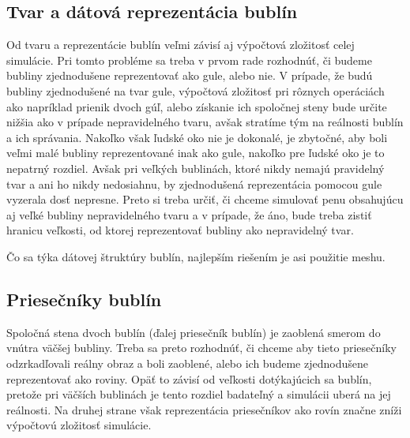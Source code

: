 \subsection{Tvar a dátová reprezentácia bublín}

Od tvaru a reprezentácie bublín veľmi závisí aj výpočtová zložitosť celej simulácie. Pri tomto probléme sa treba v prvom rade rozhodnúť, či budeme bubliny zjednodušene reprezentovať ako gule, alebo nie. V prípade, že budú bubliny zjednodušené na tvar gule, výpočtová zložitosť pri rôznych operáciách ako napríklad prienik dvoch gúľ, alebo získanie ich spoločnej steny bude určite nižšia ako v prípade nepravidelného tvaru, avšak stratíme tým na reálnosti bublín a ich správania. Nakoľko však ľudské oko nie je dokonalé, je zbytočné, aby boli veľmi malé bubliny reprezentované inak ako gule, nakoľko pre ľudské oko je to nepatrný rozdiel. Avšak pri veľkých bublinách, ktoré nikdy nemajú pravidelný tvar a ani ho nikdy nedosiahnu, by zjednodušená reprezentácia pomocou gule vyzerala dosť nepresne. Preto si treba určiť, či chceme simulovať penu obsahujúcu aj veľké bubliny nepravidelného tvaru a v prípade, že áno, bude treba zistiť hranicu veľkosti, od ktorej reprezentovať bubliny ako nepravidelný tvar.

Čo sa týka dátovej štruktúry bublín, najlepším riešením je asi použitie meshu.

\subsection{Priesečníky bublín}

Spoločná stena dvoch bublín (ďalej priesečník bublín) je zaoblená smerom do vnútra väčšej bubliny. Treba sa preto rozhodnúť, či chceme aby tieto priesečníky odzrkadľovali reálny obraz a boli zaoblené, alebo ich budeme zjednodušene reprezentovať ako roviny. Opäť to závisí od veľkosti dotýkajúcich sa bublín, pretože pri väčších bublinách je tento rozdiel badateľný a simulácii uberá na jej reálnosti. Na druhej strane však reprezentácia priesečníkov ako rovín značne zníži výpočtovú zložitosť simulácie.
